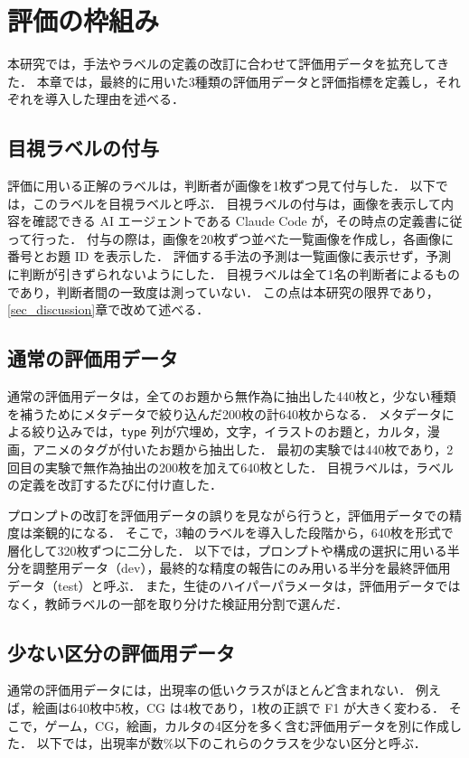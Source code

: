 \section{評価の枠組み}
\label{sec_eval}
本研究では，手法やラベルの定義の改訂に合わせて評価用データを拡充してきた．
本章では，最終的に用いた3種類の評価用データと評価指標を定義し，それぞれを導入した理由を述べる．

\subsection{目視ラベルの付与}
評価に用いる正解のラベルは，判断者が画像を1枚ずつ見て付与した．
以下では，このラベルを目視ラベルと呼ぶ．
目視ラベルの付与は，画像を表示して内容を確認できる AI エージェントである Claude Code が，その時点の定義書に従って行った．
付与の際は，画像を20枚ずつ並べた一覧画像を作成し，各画像に番号とお題 ID を表示した．
評価する手法の予測は一覧画像に表示せず，予測に判断が引きずられないようにした．
目視ラベルは全て1名の判断者によるものであり，判断者間の一致度は測っていない．
この点は本研究の限界であり，\ref{sec_discussion}章で改めて述べる．

\subsection{通常の評価用データ}
通常の評価用データは，全てのお題から無作為に抽出した440枚と，少ない種類を補うためにメタデータで絞り込んだ200枚の計640枚からなる．
メタデータによる絞り込みでは，\texttt{type} 列が穴埋め，文字，イラストのお題と，カルタ，漫画，アニメのタグが付いたお題から抽出した．
最初の実験では440枚であり，2回目の実験で無作為抽出の200枚を加えて640枚とした．
目視ラベルは，ラベルの定義を改訂するたびに付け直した．

プロンプトの改訂を評価用データの誤りを見ながら行うと，評価用データでの精度は楽観的になる．
そこで，3軸のラベルを導入した段階から，640枚を形式で層化して320枚ずつに二分した．
以下では，プロンプトや構成の選択に用いる半分を調整用データ（dev），最終的な精度の報告にのみ用いる半分を最終評価用データ（test）と呼ぶ．
また，生徒のハイパーパラメータは，評価用データではなく，教師ラベルの一部を取り分けた検証用分割で選んだ．

\subsection{少ない区分の評価用データ}
通常の評価用データには，出現率の低いクラスがほとんど含まれない．
例えば，絵画は640枚中5枚，CG は4枚であり，1枚の正誤で F1 が大きく変わる．
そこで，ゲーム，CG，絵画，カルタの4区分を多く含む評価用データを別に作成した．
以下では，出現率が数\%以下のこれらのクラスを少ない区分と呼ぶ．

